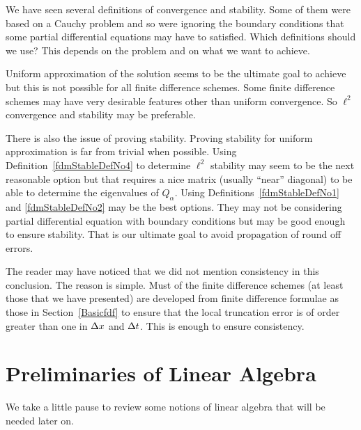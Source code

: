 We have seen several definitions of convergence and stability.  Some
of them were based on a Cauchy problem and so were ignoring the
boundary conditions that some partial differential equations may have
to satisfied.  Which definitions should we use?  This depends on the problem
and on what we want to achieve.

Uniform approximation of the solution seems to be the ultimate
goal to achieve but this is not possible for all finite difference
schemes.  Some finite difference schemes may have very desirable
features other than uniform convergence.  So $\ell^2$ convergence and
stability may be preferable.

There is also the issue of proving stability.  Proving stability for
uniform approximation is far from trivial when possible.
Using Definition~\ref{fdmStableDefNo4} to determine $\ell^2$ stability
may seem to be the next reasonable option but that requires a
nice matrix (usually ``near'' diagonal) to be able to determine the
eigenvalues of $Q_\alpha$.  Using Definitions~\ref{fdmStableDefNo1}
and \ref{fdmStableDefNo2} may be the best options.  They may not be
considering partial differential equation with boundary conditions but
may be good enough to ensure stability.  That is our ultimate goal to
avoid propagation of round off errors.

The reader may have noticed that we did not mention consistency in
this conclusion.  The reason is simple.  Must of the finite difference
schemes (at least those that we have presented) are developed from
finite difference formulae as those in Section~\ref{Basicfdf} to
ensure that the local truncation error is of order greater than one
in $\Delta{x}$ and $\Delta{t}$.  This is enough to ensure consistency.

\section{Preliminaries of Linear Algebra}

We take a little pause to review some notions of linear algebra that
will be needed later on.

